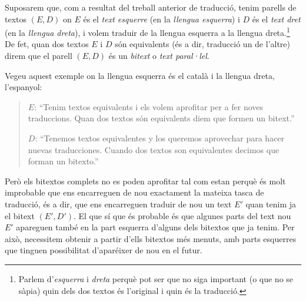 Suposarem que, com a resultat del treball anterior de traducció, tenim
parells de textos $(E,D)$ on $E$ és el \emph{text esquerre} (en la
\emph{llengua esquerra}) i $D$ és el \emph{text dret} (en la
\emph{llengua dreta}), i volem traduir de la llengua esquerra a la
llengua dreta.\footnote{Parlem d'\emph{esquerra} i \emph{dreta} perquè
  pot ser que no siga important (o que no se sàpia) quin dels dos
  textos és l'original i quin és la traducció.}  De fet, quan dos
textos $E$ i $D$ són equivalents (és a dir, traducció un de l'altre)
direm que el parell $(E,D)$ és un \emph{bitext} o \emph{text
  paral·lel}.

Vegeu aquest exemple on la llengua esquerra és el català i la llengua
dreta, l'espanyol:
\begin{quote}
  $E$: ``Tenim textos equivalents i els volem aprofitar per a fer
  noves traduccions. Quan dos textos són equivalents diem que formen
  un bitext.''

  $D$: ``Tenemos textos equivalentes y los queremos aprovechar para
  hacer nuevas traducciones. Cuando dos textos son equivalentes
  decimos que forman un bitexto.''
\end{quote}

Però els bitextos complets no es poden aprofitar tal com estan perquè
és molt improbable que ens encarreguen de nou exactament la mateixa
tasca de traducció, és a dir, que ens encarreguen traduir de nou un
text $E'$ quan tenim ja el bitext $(E',D')$. El que sí que és probable
és que algunes parts del text nou $E'$ apareguen també en la part
esquerra d'alguns dels bitextos que ja tenim. Per això, necessitem
obtenir a partir d'ells bitextos més menuts, amb parts esquerres que
tinguen possibilitat d'aparéixer de nou en el futur.

